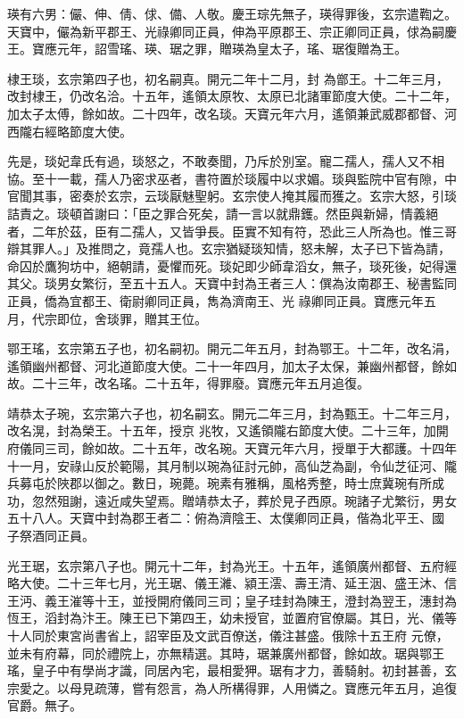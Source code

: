 \begin{pinyinscope}
 瑛有六男：儼、伸、倩、俅、備、人敬。慶王琮先無子，瑛得罪後，玄宗遣鞫之。天寶中，儼為新平郡王、光祿卿同正員，伸為平原郡王、宗正卿同正員，俅為嗣慶王。寶應元年，詔雪瑤、瑛、琚之罪，贈瑛為皇太子，瑤、琚復贈為王。



 棣王琰，玄宗第四子也，初名嗣真。開元二年十二月，封
 為鄫王。十二年三月，改封棣王，仍改名洽。十五年，遙領太原牧、太原已北諸軍節度大使。二十二年，加太子太傅，餘如故。二十四年，改名琰。天寶元年六月，遙領兼武威郡都督、河西隴右經略節度大使。



 先是，琰妃韋氏有過，琰怒之，不敢奏聞，乃斥於別室。寵二孺人，孺人又不相協。至十一載，孺人乃密求巫者，書符置於琰履中以求媚。琰與監院中官有隙，中官聞其事，密奏於玄宗，云琰厭魅聖躬。玄宗使人掩其履而獲之。玄宗大怒，引琰
 詰責之。琰頓首謝曰：「臣之罪合死矣，請一言以就鼎鑊。然臣與新婦，情義絕者，二年於茲，臣有二孺人，又皆爭長。臣實不知有符，恐此三人所為也。惟三哥辯其罪人。」及推問之，竟孺人也。玄宗猶疑琰知情，怒未解，太子已下皆為請，命囚於鷹狗坊中，絕朝請，憂懼而死。琰妃即少師韋滔女，無子，琰死後，妃得還其父。琰男女繁衍，至五十五人。天寶中封為王者三人：僎為汝南郡王、秘書監同正員，僑為宜都王、衛尉卿同正員，雋為濟南王、光
 祿卿同正員。寶應元年五月，代宗即位，舍琰罪，贈其王位。



 鄂王瑤，玄宗第五子也，初名嗣初。開元二年五月，封為鄂王。十二年，改名涓，遙領幽州都督、河北道節度大使。二十一年四月，加太子太保，兼幽州都督，餘如故。二十三年，改名瑤。二十五年，得罪廢。寶應元年五月追復。



 靖恭太子琬，玄宗第六子也，初名嗣玄。開元二年三月，封為甄王。十二年三月，改名滉，封為榮王。十五年，授京
 兆牧，又遙領隴右節度大使。二十三年，加開府儀同三司，餘如故。二十五年，改名琬。天寶元年六月，授單于大都護。十四年十一月，安祿山反於範陽，其月制以琬為征討元帥，高仙芝為副，令仙芝征河、隴兵募屯於陜郡以御之。數日，琬薨。琬素有雅稱，風格秀整，時士庶冀琬有所成功，忽然殂謝，遠近咸失望焉。贈靖恭太子，葬於見子西原。琬諸子尤繁衍，男女五十八人。天寶中封為郡王者二：俯為濟陰王、太僕卿同正員，偕為北平王、國
 子祭酒同正員。



 光王琚，玄宗第八子也。開元十二年，封為光王。十五年，遙領廣州都督、五府經略大使。二十三年七月，光王琚、儀王濰、潁王澐、壽王清、延王洇、盛王沐、信王沔、義王漼等十王，並授開府儀同三司；皇子珪封為陳王，澄封為翌王，潓封為恆王，滔封為汴王。陳王已下第四王，幼未授官，並置府官僚屬。其日，光、儀等十人同於東宮尚書省上，詔宰臣及文武百僚送，儀注甚盛。俄除十五王府
 元僚，並未有府幕，同於禮院上，亦無精選。其時，琚兼廣州都督，餘如故。琚與鄂王瑤，皇子中有學尚才識，同居內宅，最相愛狎。琚有才力，善騎射。初封甚善，玄宗愛之。以母見疏薄，嘗有怨言，為人所構得罪，人用憐之。寶應元年五月，追復官爵。無子。




\end{pinyinscope}
